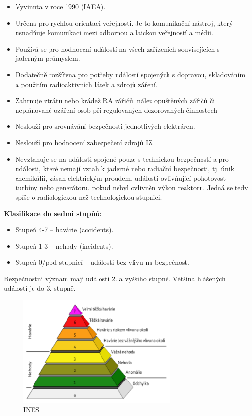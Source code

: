 \begin{itemize}
    \item Vyvinuta v roce 1990 (IAEA).
    \item Určena pro rychlou orientaci veřejnosti. Je to komunikační nástroj, který usnadňuje komunikaci mezi odbornou a laickou veřejností a médii.
    \item Používá se pro hodnocení událostí na všech zařízeních souvisejících s jaderným průmyslem.
    \item Dodatečně rozšířena pro potřeby událostí spojených s dopravou, skladováním a použitím radioaktivních látek a zdrojů záření.
    \item Zahrnuje ztrátu nebo krádež RA zářičů, nález opuštěných zářičů či neplánované ozáření osob při regulovaných dozorovaných činnostech.
    \item Neslouží pro srovnávání bezpečnosti jednotlivých elektráren.
    \item Neslouží pro hodnocení zabezpečení zdrojů IZ.
    \item Nevztahuje se na události spojené pouze s technickou bezpečností a pro události, které nemají vztah k jaderné nebo radiační bezpečnosti, tj. únik chemikálií, zásah elektrickým proudem, události ovlivňující pohotovost turbíny nebo generátoru, pokud nebyl ovlivněn výkon reaktoru. Jedná se tedy spíše o radiologickou než technologickou stupnici.
\end{itemize}

\textbf{Klasifikace do sedmi stupňů:}

\begin{itemize}
	\item Stupeň 4-7 -- havárie (accidents).
	\item Stupeň 1-3 -- nehody (incidents).
	\item Stupeň 0/pod stupnicí -- události bez vlivu na bezpečnost.
\end{itemize}
	
Bezpečnostní význam mají události 2. a vyššího stupně. Většina hlášených událostí je do 3. stupně.

\begin{figure}[h!]
	\centering
	\includegraphics[width=8cm]{img/ines.png}
	\caption{INES}
	\label{fig:ines} 
\end{figure}

